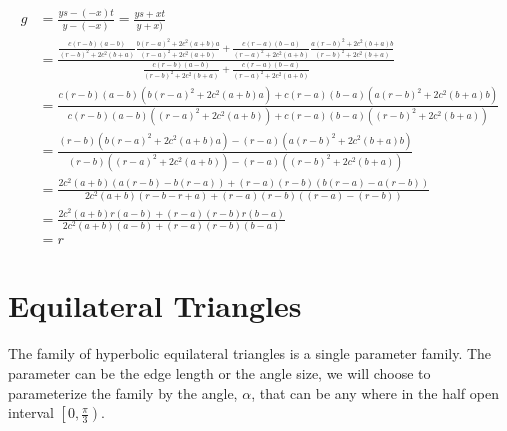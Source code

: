 \documentclass[a4paper,10pt]{article}
\begin{document}
\begin{align*}
g &= \frac{ys - (-x)t}{y - (-x)} = \frac{ys + xt}{y + x)}\\
   &= \frac{ \frac{c\left(r - b\right)\left(a - b\right)}{\left(r - b\right)^2 + 2c^2\left(b + a\right)} \frac{b\left(r - a\right)^2 + 2c^2\left(a + b\right)a}{\left(r - a\right)^2 + 2c^2\left(a + b\right)} + \frac{c\left(r - a\right)\left(b - a\right)}{\left(r - a\right)^2 + 2c^2\left(a + b\right)} \frac{a\left(r - b\right)^2 + 2c^2\left(b + a\right)b}{\left(r - b\right)^2 + 2c^2\left(b + a\right)} }{ \frac{c\left(r - b\right)\left(a - b\right)}{\left(r - b\right)^2 + 2c^2\left(b + a\right)} + \frac{c\left(r - a\right)\left(b - a\right)}{\left(r - a\right)^2 + 2c^2\left(a + b\right)} }\\
  &= \frac{c\left(r - b\right)\left(a - b\right) \left(b\left(r - a\right)^2 + 2c^2\left(a + b\right)a\right) + c\left(r - a\right)\left(b - a\right) \left(a\left(r - b\right)^2 + 2c^2\left(b + a\right)b\right) }{c\left(r - b\right)\left(a - b\right)\left(\left(r - a\right)^2 + 2c^2\left(a + b\right)\right) + c\left(r - a\right)\left(b - a\right)\left(\left(r - b\right)^2 + 2c^2\left(b + a\right)\right) }\\
  &= \frac{\left(r - b\right) \left(b\left(r - a\right)^2 + 2c^2\left(a + b\right)a\right) - \left(r - a\right) \left(a\left(r - b\right)^2 + 2c^2\left(b + a\right)b\right) }{\left(r - b\right)\left(\left(r - a\right)^2 + 2c^2\left(a + b\right)\right) - \left(r - a\right)\left(\left(r - b\right)^2 + 2c^2\left(b + a\right)\right) }\\
  &= \frac{2c^2\left(a + b\right)\left(a\left(r - b\right) - b\left(r - a\right)\right) + \left(r - a\right)\left(r - b\right)\left( b\left(r - a\right) - a\left(r - b\right)\right)}{2c^2\left(a + b\right)\left(r - b - r + a\right) + \left(r - a\right)\left(r - b\right)\left(\left(r - a\right) - \left(r - b\right)\right)}\\
  &= \frac{2c^2\left(a + b\right)r\left(a - b\right) + \left(r - a\right)\left(r - b\right)r\left(b - a\right)}{2c^2\left(a + b\right)\left(a - b\right) + \left(r - a\right)\left(r - b\right)\left(b - a\right)}\\
&= r
\end {align*}

\section{Equilateral Triangles}

The family of hyperbolic equilateral triangles is a single parameter 
family. The parameter can be the edge length or the angle size, we will
choose to parameterize the family by the angle, $\alpha$, that can be
any where in the half open interval $\left[0, \frac{\pi}{3}\right)$.
\end{document}
